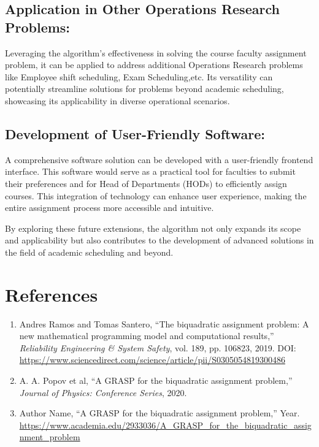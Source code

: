 \documentclass{article}
\begin{document}
\subsection{Application in Other Operations Research Problems:}
Leveraging the algorithm's effectiveness in solving the course faculty assignment problem, it can be applied to address additional Operations Research problems like Employee shift scheduling, Exam Scheduling,etc. Its versatility can potentially streamline solutions for problems beyond academic scheduling, showcasing its applicability in diverse operational scenarios.

\subsection{Development of User-Friendly Software:}
A comprehensive software solution can be developed with a user-friendly frontend interface. This software would serve as a practical tool for faculties to submit their preferences and for Head of Departments (HODs) to efficiently assign courses. This integration of technology can enhance user experience, making the entire assignment process more accessible and intuitive.

By exploring these future extensions, the algorithm not only expands its scope and applicability but also contributes to the development of advanced solutions in the field of academic scheduling and beyond.
\section*{References}
\begin{enumerate}
    \item Andres Ramos and Tomas Santero, ``The biquadratic assignment problem: A new mathematical programming model and computational results,'' \textit{Reliability Engineering \& System Safety}, vol. 189, pp. 106823, 2019. DOI: \url{https://www.sciencedirect.com/science/article/pii/S0305054819300486}

    \item A. A. Popov et al, ``A GRASP for the biquadratic assignment problem,'' \textit{Journal of Physics: Conference Series}, 2020.

    \item Author Name, ``A GRASP for the biquadratic assignment problem,'' Year. \url{https://www.academia.edu/2933036/A_GRASP_for_the_biquadratic_assignment_problem}
\end{enumerate}

\printindex
\end{document}
